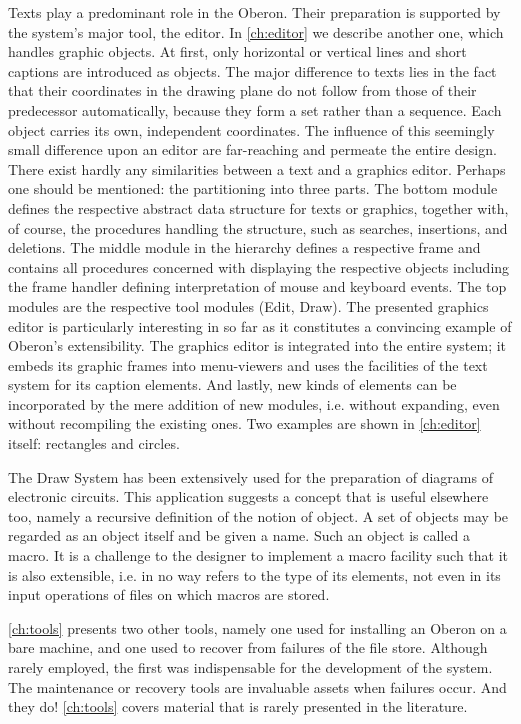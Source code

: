 Texts play a predominant role in the Oberon. Their preparation is supported by the
system's major tool, the editor. In \ref{ch:editor} we describe another one, which handles graphic
objects. At first, only horizontal or vertical lines and short captions are introduced as objects. The
major difference to texts lies in the fact that their coordinates in the drawing plane do not follow from
those of their predecessor automatically, because they form a set rather than a sequence. Each
object carries its own, independent coordinates. The influence of this seemingly small difference
upon an editor are far-reaching and permeate the entire design. There exist hardly any similarities
between a text and a graphics editor. Perhaps one should be mentioned: the partitioning into three
parts. The bottom module defines the respective abstract data structure for texts or graphics,
together with, of course, the procedures handling the structure, such as searches, insertions, and
deletions. The middle module in the hierarchy defines a respective frame and contains all
procedures concerned with displaying the respective objects including the frame handler defining
interpretation of mouse and keyboard events. The top modules are the respective tool modules
(Edit, Draw). The presented graphics editor is particularly interesting in so far as it constitutes a
convincing example of Oberon's extensibility. The graphics editor is integrated into the entire
system; it embeds its graphic frames into menu-viewers and uses the facilities of the text system for
its caption elements. And lastly, new kinds of elements can be incorporated by the mere addition of
new modules, i.e. without expanding, even without recompiling the existing ones. Two examples
are shown in \ref{ch:editor} itself: rectangles and circles.

The Draw System has been extensively used for the preparation of diagrams of electronic circuits.
This application suggests a concept that is useful elsewhere too, namely a recursive definition of
the notion of object. A set of objects may be regarded as an object itself and be given a name.
Such an object is called a macro. It is a challenge to the designer to implement a macro facility
such that it is also extensible, i.e. in no way refers to the type of its elements, not even in its 
input operations of files on which macros are stored.

\ref{ch:tools} presents two other tools, namely one used for installing an Oberon on a bare
machine, and one used to recover from failures of the file store. Although rarely employed, the first
was indispensable for the development of the system. The maintenance or recovery tools are
invaluable assets when failures occur. And they do! \ref{ch:tools} covers material that is rarely
presented in the literature.


